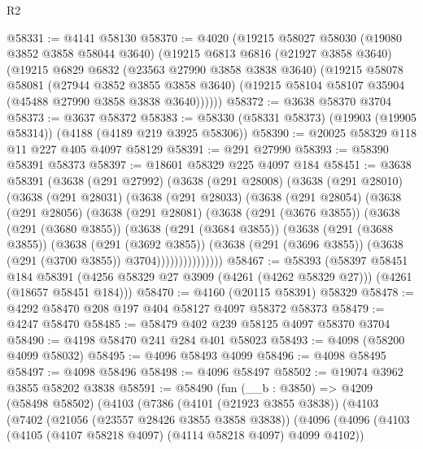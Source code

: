 \begin{lexlean}{R2}
\begin{coremodule}
@58331 := @4141 @58130
@58370 := @4020
    (@19215
      @58027
      @58030
      (@19080 @3852 @3858 @58044 @3640)
      (@19215
        @6813
        @6816
        (@21927 @3858 @3640)
        (@19215
          @6829
          @6832
          (@23563 @27990 @3858 @3838 @3640)
          (@19215
            @58078
            @58081
            (@27944 @3852 @3855 @3858 @3640)
            (@19215 @58104 @58107 @35904 (@45488 @27990 @3858 @3838 @3640))))))
@58372 := @3638 @58370 @3704
@58373 := @3637 @58372
@58383 := @58330 (@58331 @58373) (@19903 (@19905 @58314)) (@4188 (@4189 @219 @3925 @58306))
@58390 := @20025 @58329 @118 @11 @227 @405 @4097 @58129
@58391 := @291 @27990
@58393 := @58390 @58391 @58373
@58397 := @18601 @58329 @225 @4097 @184
@58451 := @3638
    @58391
    (@3638
      (@291 @27992)
      (@3638
        (@291 @28008)
        (@3638
          (@291 @28010)
          (@3638
            (@291 @28031)
            (@3638
              (@291 @28033)
              (@3638
                (@291 @28054)
                (@3638
                  (@291 @28056)
                  (@3638
                    (@291 @28081)
                    (@3638
                      (@291 (@3676 @3855))
                      (@3638
                        (@291 (@3680 @3855))
                        (@3638
                          (@291 (@3684 @3855))
                          (@3638
                            (@291 (@3688 @3855))
                            (@3638
                              (@291 (@3692 @3855))
                              (@3638
                                (@291 (@3696 @3855))
                                (@3638 (@291 (@3700 @3855)) @3704)))))))))))))))
@58467 := @58393
    (@58397
      @58451
      @184
      @58391
      (@4256 @58329 @27 @3909 (@4261 (@4262 @58329 @27)))
      (@4261 (@18657 @58451 @184)))
@58470 := @4160 (@20115 @58391) @58329
@58478 := @4292 @58470 @208 @197 @404 @58127 @4097 @58372 @58373
@58479 := @4247 @58470
@58485 := @58479 @402 @239 @58125 @4097 @58370 @3704
@58490 := @4198 @58470 @241 @284 @401 @58023
@58493 := @4098 (@58200 @4099 @58032)
@58495 := @4096 @58493 @4099
@58496 := @4098 @58495
@58497 := @4098 @58496
@58498 := @4096 @58497
@58502 := @19074 @3962 @3855 @58202 @3838
@58591 := @58490
    (fun (__b : @3850) =>
    @4209
      (@58498 @58502)
      (@4103
        (@7386
          (@4101 (@21923 @3855 @3838))
          (@4103
            (@7402
              (@21056 (@23557 @28426 @3855 @3858 @3838))
              (@4096
                (@4096
                  (@4103 (@4105 (@4107 @58218 @4097) (@4114 @58218 @4097) @4099 @4102))

\end{coremodule}
\end{lexlean}
